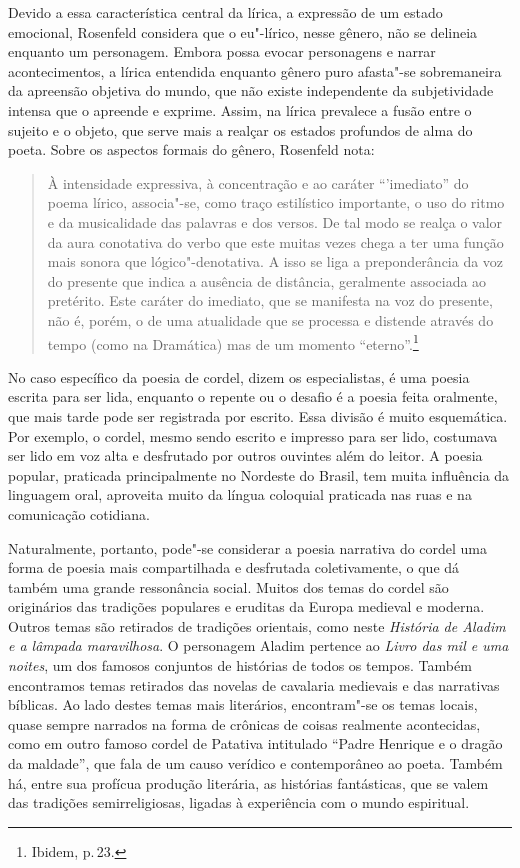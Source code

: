 \documentclass[11pt]{extarticle}
\begin{document}
Devido a essa característica central da lírica, a expressão de um estado emocional, Rosenfeld considera que o eu"-lírico, nesse gênero, não se delineia enquanto um personagem. Embora possa evocar personagens e narrar acontecimentos, a lírica entendida enquanto gênero puro afasta"-se sobremaneira da apreensão objetiva do mundo, que não existe independente da subjetividade intensa que o apreende e exprime. Assim, na lírica prevalece a fusão entre o sujeito e o objeto, que serve mais a realçar os estados profundos de alma do poeta.
Sobre os aspectos formais do gênero, Rosenfeld nota:

\begin{quote}
À intensidade expressiva, à concentração e ao caráter ``'imediato'' do poema lírico, associa"-se, como traço estilístico importante, o uso do ritmo e da musicalidade das palavras e dos versos. De tal modo se realça o valor da aura conotativa do verbo que este muitas vezes chega a ter uma função mais sonora que lógico"-denotativa. A isso se liga a preponderância da voz do presente que indica a ausência de distância, geralmente associada ao pretérito. Este caráter do imediato, que se manifesta na voz do presente, não é, porém, o de uma atualidade que se processa e distende através do tempo (como na Dramática) mas de um momento ``eterno''.\footnote{Ibidem, p.\,23.}
\end{quote}

No caso específico da poesia de cordel, dizem os especialistas, é uma poesia escrita para
ser lida, enquanto o repente ou o desafio é a poesia feita oralmente, que mais tarde pode
ser registrada por escrito. Essa divisão é muito esquemática. Por exemplo, o
cordel, mesmo sendo escrito e impresso para ser lido, costumava ser lido em
voz alta e desfrutado por outros ouvintes além do leitor. A poesia popular,
praticada principalmente no Nordeste do Brasil, tem muita influência da
linguagem oral, aproveita muito da língua coloquial praticada nas ruas e na
comunicação cotidiana. 

Naturalmente, portanto, pode"-se considerar a poesia narrativa do cordel uma
forma de poesia mais compartilhada e desfrutada coletivamente, o que dá também
uma grande ressonância social. Muitos dos temas do cordel são originários das
tradições populares e eruditas da Europa medieval e moderna. Outros temas são
retirados de tradições orientais, como neste \textit{História de
Aladim e a lâmpada maravilhosa}. O personagem Aladim pertence ao \textit{Livro das mil
e uma noites}, um dos famosos conjuntos de histórias de todos os tempos. Também
encontramos temas retirados das novelas de cavalaria medievais e das narrativas
bíblicas. Ao lado destes temas mais literários, encontram"-se os temas locais,
quase sempre narrados na forma de crônicas de coisas realmente acontecidas,
como em outro famoso cordel de Patativa intitulado  “Padre Henrique e o dragão da maldade”, que fala de um causo verídico e contemporâneo ao poeta. Também há, entre sua profícua produção literária, as histórias
fantásticas, que se valem das tradições semirreligiosas, ligadas à experiência
com o mundo espiritual. 
\end{document}
